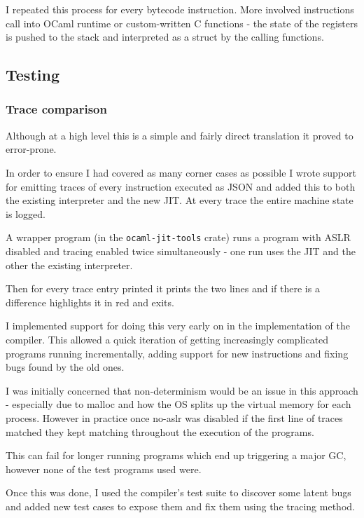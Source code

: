 I repeated this process for every bytecode instruction. More involved instructions call into
OCaml runtime or custom-written C functions - the state of the registers is pushed to the stack
and interpreted as a struct by the calling functions.

\subsection{Testing}

\subsubsection{Trace comparison}

Although at a high level this is a simple and fairly direct translation it proved to error-prone.

In order to ensure I had covered as many corner cases as possible I wrote support for emitting
traces of every instruction executed as JSON and added this to both the existing interpreter
and the new JIT. At every trace the entire machine state is logged.

A wrapper program (in the \texttt{ocaml-jit-tools} crate) runs a program with ASLR disabled and
tracing enabled twice
simultaneously - one run uses the JIT and the other the existing interpreter.

Then for every trace entry printed it prints the two lines and if there is a difference highlights
it in red and exits.

I implemented support for doing this very early on in the implementation of the compiler. This
allowed a quick iteration of getting increasingly complicated programs running incrementally,
adding support for new instructions and fixing bugs found by the old ones.

I was initially concerned that non-determinism would be an issue in this approach - especially
due to malloc and how the OS splits up the virtual memory for each process. However in practice
once no-aslr was disabled if the first line of traces matched they kept matching throughout the
execution of the programs.

This can fail for longer running programs which end up triggering a major GC, however none of the
test programs used were.

Once this was done, I used the compiler's test suite to discover some latent bugs and added new
test cases to expose them and fix them using the tracing method.

